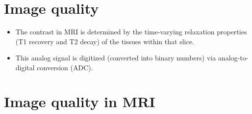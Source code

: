 \section{Image quality}
\begin{itemize}
\item The contrast in \gls{MRI} is determined by the
  time-varying relaxation properties (T1 recovery and T2 decay) of the
  tissues within that slice.
\item This analog signal is digitized (converted
  into binary numbers) via analog-to-digital conversion (ADC). 
\end{itemize}

\section{Image quality in \gls{MRI}}

